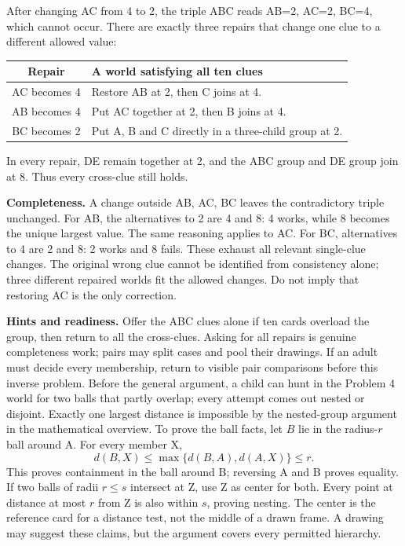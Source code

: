 After changing AC from 4 to 2, the triple ABC reads AB=2, AC=2, BC=4, which cannot occur. There are exactly three repairs that change one clue to a different allowed value:
\begin{center}\renewcommand{\arraystretch}{1.35}
\begin{tabular}{c p{10.8cm}}
Repair & A world satisfying all ten clues\\\midrule
AC becomes 4 & Restore AB at 2, then C joins at 4.\\
AB becomes 4 & Put AC together at 2, then B joins at 4.\\
BC becomes 2 & Put A, B and C directly in a three-child group at 2.\\\bottomrule
\end{tabular}\end{center}
In every repair, DE remain together at 2, and the ABC group and DE group join at 8. Thus every cross-clue still holds.

\textbf{Completeness.} A change outside AB, AC, BC leaves the contradictory triple unchanged. For AB, the alternatives to 2 are 4 and 8: 4 works, while 8 becomes the unique largest value. The same reasoning applies to AC. For BC, alternatives to 4 are 2 and 8: 2 works and 8 fails. These exhaust all relevant single-clue changes. The original wrong clue cannot be identified from consistency alone; three different repaired worlds fit the allowed changes. Do not imply that restoring AC is the only correction.

\textbf{Hints and readiness.} Offer the ABC clues alone if ten cards overload the group, then return to all the cross-clues. Asking for all repairs is genuine completeness work; pairs may split cases and pool their drawings. If an adult must decide every membership, return to visible pair comparisons before this inverse problem.
\newpage
{}
Before the general argument, a child can hunt in the Problem 4 world for two balls that partly overlap; every attempt comes out nested or disjoint. Exactly one largest distance is impossible by the nested-group argument in the mathematical overview. To prove the ball facts, let $B$ lie in the radius-$r$ ball around A. For every member X,
\[
d(B,X)\le\max\{d(B,A),d(A,X)\}\le r.
\]
This proves containment in the ball around B; reversing A and B proves equality. If two balls of radii $r\le s$ intersect at Z, use Z as center for both. Every point at distance at most $r$ from Z is also within $s$, proving nesting. The center is the reference card for a distance test, not the middle of a drawn frame. A drawing may suggest these claims, but the argument covers every permitted hierarchy.

